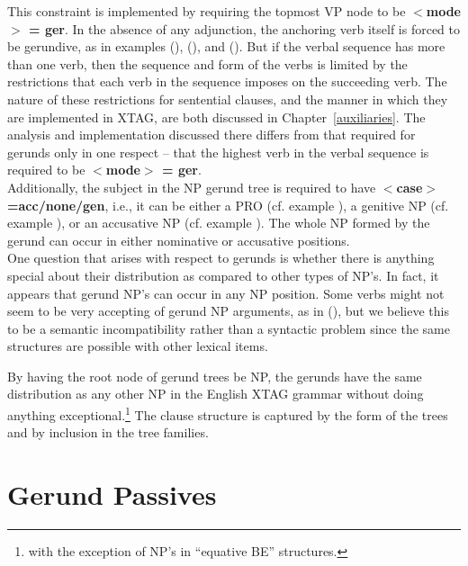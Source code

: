 {

This constraint is implemented by requiring the topmost VP node to be {\bf
$<$mode$>$ = ger}. In the absence of any adjunction, the anchoring verb
itself is forced to be gerundive, as in examples (), (), and
(). But if the verbal sequence has more than one verb, then the
sequence and form of the verbs is limited by the restrictions that each
verb in the sequence imposes on the succeeding verb. The nature of these
restrictions for sentential clauses, and the manner in which they are
implemented in XTAG, are both discussed in Chapter~\ref{auxiliaries}. The
analysis and implementation discussed there differs from that required for
gerunds only in one respect -- that the highest verb in the verbal sequence
is required to be {\bf $<$mode$>$ = ger}.\\

Additionally, the subject in the NP gerund tree is required to have {\bf
$<$case$>$=acc/none/gen}, i.e., it can be either a PRO (cf. example
), a genitive NP (cf. example ), or an accusative NP
(cf. example ). The whole NP formed by the gerund can occur in either
nominative or accusative positions.\\

One question that arises with respect to gerunds is whether there is anything
special about their distribution as compared to other types of NP's.  In fact,
it appears that gerund NP's can occur in any NP position.  Some verbs might not
seem to be very accepting of gerund NP arguments, as in (), but we
believe this to be a semantic incompatibility rather than a syntactic problem
since the same structures are possible with other lexical items.


By having the root node of gerund trees be NP, the gerunds have the same
distribution as any other NP in the English XTAG grammar without doing
anything exceptional.\footnote{with the exception of NP's in ``equative
BE'' structures.} The clause structure is captured by the form of the trees
and by inclusion in the tree families.\\

\section{Gerund Passives}

}
